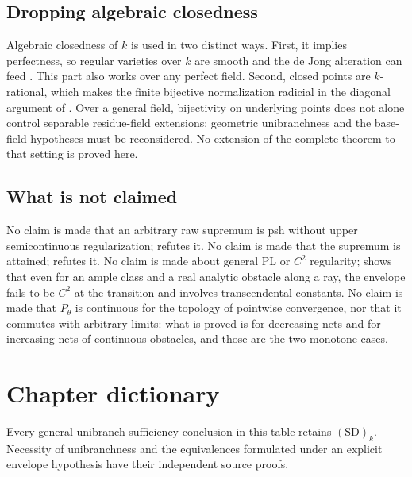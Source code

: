 \subsection{Dropping algebraic closedness}
\label{sec:ch45-failure-closed}

Algebraic closedness of $k$ is used in two distinct ways.  First, it implies perfectness, so regular
varieties over $k$ are smooth and the de Jong alteration can feed
.  This part also works over any perfect
field.  Second, closed points are $k$-rational, which makes the finite
bijective normalization radicial in the diagonal argument of
.
Over a general field, bijectivity on underlying points does not alone
control separable residue-field extensions; geometric unibranchness and
the base-field hypotheses must be reconsidered.  No extension of the
complete theorem to that setting is proved here.

\subsection{What is not claimed}
\label{sec:ch45-failure-notclaimed}

No claim is made that an arbitrary raw supremum is psh without upper
semicontinuous regularization;  refutes it.
No claim is made that the supremum is attained;
 refutes it.  No claim is made about
general PL or $C^2$ regularity;  shows
that even for an
ample class and a real analytic obstacle along a ray, the envelope fails
to be $C^2$ at the transition and
involves transcendental constants.  No claim is made that
$P_\theta$ is continuous for the topology of pointwise convergence, nor
that it commutes with arbitrary limits: what is proved is
 for decreasing nets and
 for increasing nets of continuous
obstacles, and those are the two monotone cases.

\section{Chapter dictionary}
\label{sec:ch45-dictionary}

Every general unibranch sufficiency conclusion in this table retains
$\mathrm{(SD)}_k$. Necessity of unibranchness and the equivalences formulated
under an explicit envelope hypothesis have their independent source proofs.

